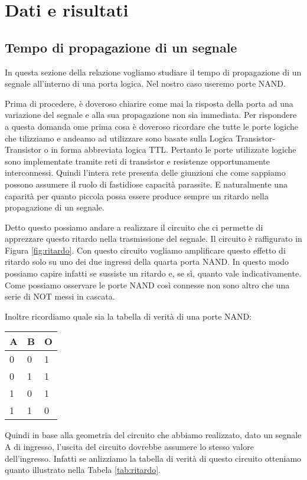 \section*{Dati e risultati}

\subsection*{Tempo di propagazione di un segnale}

In questa sezione della relazione vogliamo studiare il tempo di propagazione di un segnale all'interno di una porta logica. Nel nostro caso useremo porte NAND.

Prima di procedere, è doveroso chiarire come mai la risposta della porta ad una variazione del segnale e alla sua propagazione non sia immediata.
Per rispondere a questa domanda ome prima cosa è doveroso ricordare che tutte le porte logiche che tilizziamo e andeamo ad utilizzare sono basate sulla Logica Transistor-Transistor o in forma abbreviata logica TTL. Pertanto le porte utilizzate logiche sono implementate tramite reti di transistor e resistenze opportunamente interconnessi. Quindi l'intera rete presenta delle giunzioni che come sappiamo possono assumere il ruolo di fastidiose capacità parassite. E naturalmente una caparità per quanto piccola possa essere produce sempre un ritardo nella propagazione di un segnale.

Detto questo possiamo andare a realizzare il circuito che ci permette di apprezzare questo ritardo nella trasmissione del segnale. Il circuito è raffigurato in Figura \ref{fig:ritardo}. Con questo circuito vogliamo amplificare questo effetto di ritardo solo su uno dei due ingressi della quarta porta NAND. In questo modo possiamo capire infatti se sussiste un ritardo e, se sì, quanto vale indicativamente. Come possiamo osservare le porte NAND così connesse non sono altro che una serie di NOT messi in cascata.

Inoltre ricordiamo quale sia la tabella di verità di una porte NAND:

\begin{center}
	\begin{tabular}{lll}
	\toprule
		A & B & O\\
	\midrule
		0 & 0 & 1 \\
		0 & 1 & 1 \\
		1 & 0 & 1 \\
		1 & 1 & 0 \\
	\bottomrule
	\end{tabular}
\end{center}
%
Quindi in base alla geometria del circuito che abbiamo realizzato, dato un segnale A di ingresso, l'uscita del circuito dovrebbe assumere lo stesso valore dell'ingresso. Infatti se anlizziamo la tabella di verità di questo circuito otteniamo quanto illustrato nella Tabela \ref{tab:ritardo}.

